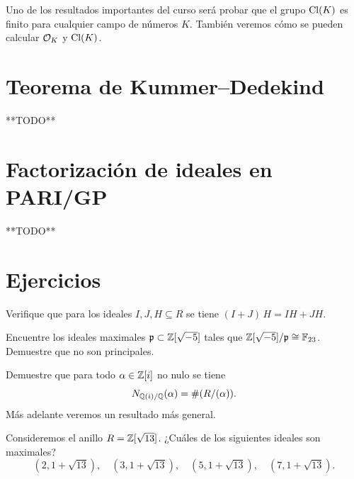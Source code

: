 Uno de los resultados importantes del curso será probar que el grupo $\operatorname{Cl} (K)$
es finito para cualquier campo de números $K$. También veremos cómo se
pueden calcular $\mathcal{O}_K$ y $\operatorname{Cl} (K)$.


\section{Teorema de Kummer--Dedekind}

**TODO**


\section{Factorización de ideales en PARI/GP}

**TODO**


\pagebreak


\section*{Ejercicios}

\begin{ejercicio}
  Verifique que para los ideales $I, J, H \subseteq R$ se tiene
  $(I+J)\,H = IH + JH$.
\end{ejercicio}

\begin{ejercicio}
  Encuentre los ideales maximales $\mathfrak{p} \subset \mathbb{Z} [\sqrt{-5}]$ tales
  que $\mathbb{Z} [\sqrt{-5}]/\mathfrak{p} \cong \mathbb{F}_{23}$. Demuestre que no son
  principales.
\end{ejercicio}

\begin{ejercicio}
  Demuestre que para todo $\alpha \in \mathbb{Z} [i]$ no nulo se tiene
  $$N_{\mathbb{Q} (i)/\mathbb{Q}} (\alpha) = \# (R/(\alpha)).$$
  Más adelante veremos un resultado más general.
\end{ejercicio}

\begin{ejercicio}
  Consideremos el anillo $R = \mathbb{Z} [\sqrt{13}]$. ¿Cuáles de los siguientes
  ideales son maximales?
  \[ (2, 1 + \sqrt{13}), \quad
     (3, 1 + \sqrt{13}), \quad
     (5, 1 + \sqrt{13}), \quad
     (7, 1 + \sqrt{13}). \]
\end{ejercicio}

